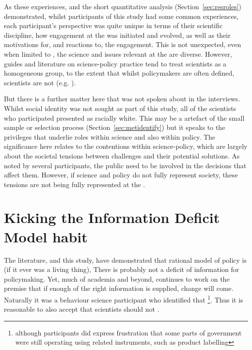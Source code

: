 As these experiences, and the short quantitative analysis (Section~\ref{sec:resroles}) demonstrated, whilst participants of this study had some common experiences, each participant's perspective was quite unique in terms of their scientific discipline, how engagement at the \SPI{} was initiated and evolved, as well as their motivations for, and reactions to, the engagement. This is not unexpected, even when limited to \CAN{}, the science and issues relevant at the \SPI{} are diverse. However, guides and literature on science-policy practice tend to treat scientists as a homogeneous group, to the extent that whilst policymakers are often defined, scientists are not (e.g. \cite{BA2024trust}). 

But there is a further matter here that was not spoken about in the interviews. Whilst social identity was not sought as part of this study, all of the scientists who participated presented as racially white. This may be a artefact of the small sample or selection process (Section~\ref{sec:metidentify}) but it speaks to the privileges that underlie roles within science and also within policy. The significance here relates to the contentions within \CAN{} science-policy, which are largely about the societal tensions between \CAN{} challenges and their potential solutions. As noted by several participants, the public need to be involved in the decisions that affect them. However, if science and policy do not fully represent society, these tensions are not being fully represented at the \SPI{}. 

\section{Kicking the Information Deficit Model habit}\label{sec:disdeficit}

The literature, and this study, have demonstrated that rational model of policy is  (if it ever was a living thing), There is probably not a deficit of information for \CAN{} policymaking. Yet, much of academia and beyond, continues to work on the \IDM{} premise that if enough of the right information is supplied, change will come. Naturally it was a behaviour science participant who identified that \footnote{although participants did express frustration that some parts of government were still operating using related instruments, such as product labelling}. Thus it is reasonable to also accept that scientists should not .

